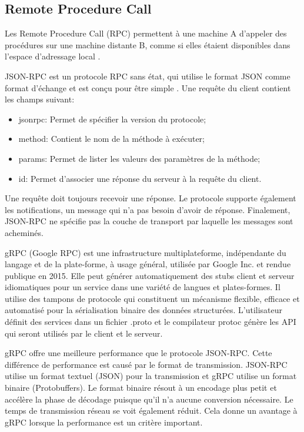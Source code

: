 \subsection{Remote Procedure Call}

Les Remote Procedure Call (RPC) permettent à une machine A d'appeler des procédures sur une machine distante B, comme si elles étaient disponibles dans l'espace d'adressage local \cite{Coulouris_2012}.

JSON-RPC est un protocole RPC sans état, qui utilise le format JSON comme format d'échange et est conçu pour être simple \cite{JsonRpcSpec}. Une requête du client contient les champs suivant:
\begin{itemize}
    \item jsonrpc: Permet de spéciﬁer la version du protocole;
    \item method: Contient le nom de la méthode à exécuter;
    \item params: Permet de lister les valeurs des paramètres de la méthode;
    \item id: Permet d'associer une réponse du serveur à la requête du client.
\end{itemize}
Une requête doit toujours recevoir une réponse. Le protocole supporte également les notiﬁcations, un message qui n'a pas besoin d'avoir de réponse. Finalement, JSON-RPC ne spéciﬁe pas la couche de transport par laquelle les messages sont acheminés.

gRPC (Google RPC) est une infrastructure multiplateforme, indépendante du langage et de la plate-forme, à usage général, utilisée par Google Inc. et rendue publique en 2015. Elle peut générer automatiquement des stubs client et serveur idiomatiques pour un service dans une variété de langues et plates-formes. Il utilise des tampons de protocole qui constituent un mécanisme flexible, efficace et automatisé pour la sérialisation binaire des données structurées. L'utilisateur déﬁnit des services dans un ﬁchier .proto et le compilateur protoc génère les API qui seront utilisés par le client et le serveur.

gRPC offre une meilleure performance que le protocole JSON-RPC. \cite{kiraly2018analysing} Cette différence de performance est causé par le format de transmission. JSON-RPC utilise un format textuel (JSON) pour la transmission et gRPC utilise un format binaire (Protobuffers). Le format binaire résout à un encodage plus petit et accélère la phase de décodage puisque qu'il n'a aucune conversion nécessaire. Le temps de transmission réseau se voit également réduit. Cela donne un avantage à gRPC lorsque la performance est un critère important.


